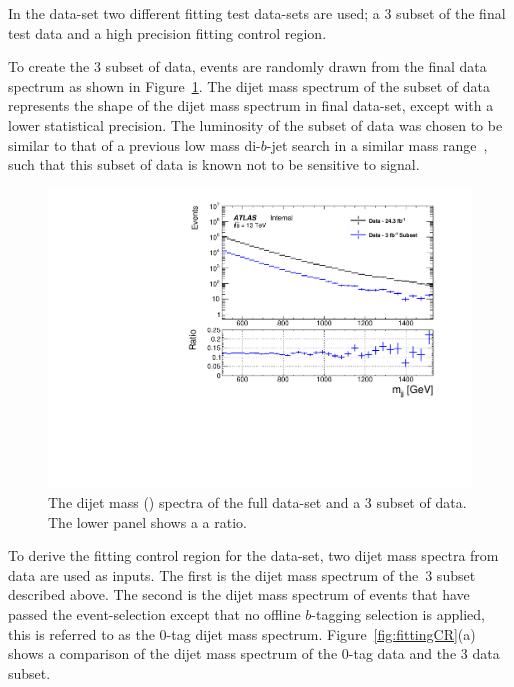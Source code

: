 
In the \lm{} data-set two different fitting test data-sets are used;
a 3 \ifb{} subset of the final test data and a high precision fitting control region.

To create the 3 \ifb{} subset of data,
events are randomly drawn from the final data spectrum as shown in Figure~\ref{fig:fittingDataSubset}.
The dijet mass spectrum of the subset of data represents the shape of the dijet mass spectrum in final data-set,
except with a lower statistical precision.
The luminosity of the subset of data was chosen to be similar to that of a
previous low mass di-$b$-jet search in a similar mass range~\cite{dibjet-lhcp_conf},
such that this subset of data is known not to be sensitive to signal.

\begin{figure}[!htb]
\captionsetup[subfigure]{aboveskip=0pt,justification=centering}
\centering
\includegraphics[width=0.7\linewidth, angle=0]{figs/Dibjet/LowMass/FitStudy/subset_dataComp.pdf}
\caption{\label{fig:fittingDataSubset}
  The dijet mass (\mjj{}) spectra of the full \lm{} data-set and a 3 \ifb{} subset of \lm{} data.
  The lower panel shows a a ratio.}
\end{figure}

To derive the fitting control region for the \lm{} data-set,
two dijet mass spectra from data are used as inputs.
The first is the dijet mass spectrum of the~3 \ifb{} subset described above.
The second is the dijet mass spectrum of events that have passed the \lm{} event-selection
except that no offline $b$-tagging selection is applied, this is referred to as the 0-tag dijet mass spectrum.
Figure~\ref{fig:fittingCR}(a) shows a comparison of the dijet mass spectrum of the 0-tag data and the 3 \ifb{} data subset.

